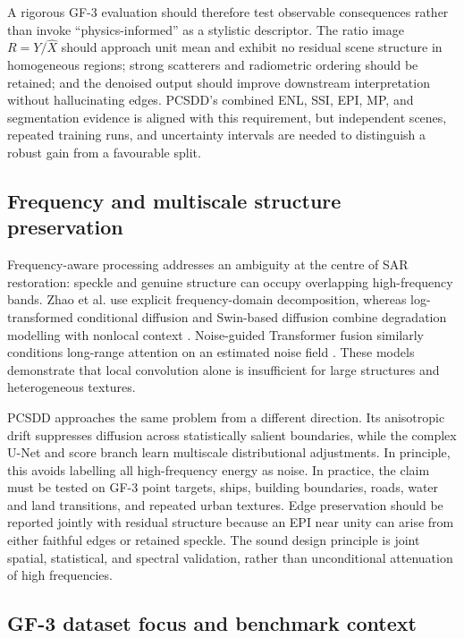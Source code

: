 \documentclass[11pt]{article}
\begin{document}
A rigorous GF-3 evaluation should therefore test observable consequences rather than invoke ``physics-informed'' as a stylistic descriptor. The ratio image $R=Y/\widehat{X}$ should approach unit mean and exhibit no residual scene structure in homogeneous regions; strong scatterers and radiometric ordering should be retained; and the denoised output should improve downstream interpretation without hallucinating edges. PCSDD's combined ENL, SSI, EPI, MP, and segmentation evidence is aligned with this requirement, but independent scenes, repeated training runs, and uncertainty intervals are needed to distinguish a robust gain from a favourable split.

\subsection{Frequency and multiscale structure preservation}

Frequency-aware processing addresses an ambiguity at the centre of SAR restoration: speckle and genuine structure can occupy overlapping high-frequency bands. Zhao et al. use explicit frequency-domain decomposition, whereas log-transformed conditional diffusion and Swin-based diffusion combine degradation modelling with nonlocal context \cite{Zhao2024Frequency,Ma2024ConditionalDiffusion,Pan2024SwinDiffusion}. Noise-guided Transformer fusion similarly conditions long-range attention on an estimated noise field \cite{Zhang2025NGT}. These models demonstrate that local convolution alone is insufficient for large structures and heterogeneous textures.

PCSDD approaches the same problem from a different direction. Its anisotropic drift suppresses diffusion across statistically salient boundaries, while the complex U-Net and score branch learn multiscale distributional adjustments. In principle, this avoids labelling all high-frequency energy as noise. In practice, the claim must be tested on GF-3 point targets, ships, building boundaries, roads, water and land transitions, and repeated urban textures. Edge preservation should be reported jointly with residual structure because an EPI near unity can arise from either faithful edges or retained speckle. The sound design principle is joint spatial, statistical, and spectral validation, rather than unconditional attenuation of high frequencies.

\subsection{GF-3 dataset focus and benchmark context}
\end{document}
